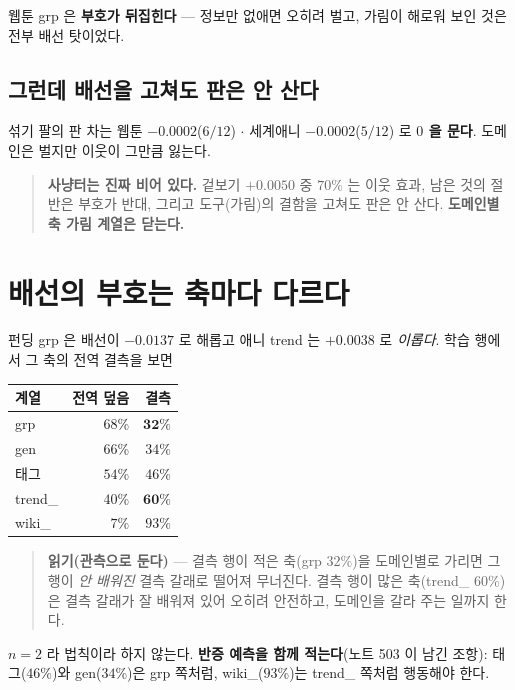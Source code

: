 \documentclass[11pt]{article}
\begin{document}
웹툰 grp 은 \textbf{부호가 뒤집힌다} --- 정보만 없애면 오히려 벌고,
가림이 해로워 보인 것은 전부 배선 탓이었다.

\subsection*{그런데 배선을 고쳐도 판은 안 산다}

섞기 팔의 판 차는 웹툰 $-0.0002$($6/12$) $\cdot$ 세계애니 $-0.0002$($5/12$)
로 \textbf{$0$ 을 문다}. 도메인은 벌지만 이웃이 그만큼 잃는다.

\begin{quote}
\textbf{사냥터는 진짜 비어 있다.} 겉보기 $+0.0050$ 중 $70\%$ 는 이웃 효과,
남은 것의 절반은 부호가 반대, 그리고 도구(가림)의 결함을 고쳐도 판은
안 산다. \textbf{도메인별 축 가림 계열은 닫는다.}
\end{quote}

\section{배선의 부호는 축마다 다르다}

펀딩 grp 은 배선이 $-0.0137$ 로 해롭고 애니 trend 는 $+0.0038$ 로
\emph{이롭다}. 학습 행에서 그 축의 전역 결측을 보면

\begin{center}
\begin{tabular}{lrr}
\hline
계열 & 전역 덮음 & 결측 \\
\hline
grp & $68\%$ & $\mathbf{32\%}$ \\
gen & $66\%$ & $34\%$ \\
태그 & $54\%$ & $46\%$ \\
trend\_ & $40\%$ & $\mathbf{60\%}$ \\
wiki\_ & $7\%$ & $93\%$ \\
\hline
\end{tabular}
\end{center}

\begin{quote}
\textbf{읽기(관측으로 둔다)} --- 결측 행이 적은 축(grp $32\%$)을 도메인별로
가리면 그 행이 \emph{안 배워진} 결측 갈래로 떨어져 무너진다. 결측 행이 많은
축(trend\_ $60\%$)은 결측 갈래가 잘 배워져 있어 오히려 안전하고, 도메인을
갈라 주는 일까지 한다.
\end{quote}

$n=2$ 라 법칙이라 하지 않는다. \textbf{반증 예측을 함께 적는다}(노트 503 이
남긴 조항): 태그($46\%$)와 gen($34\%$)은 grp 쪽처럼, wiki\_($93\%$)는
trend\_ 쪽처럼 행동해야 한다.
\end{document}
